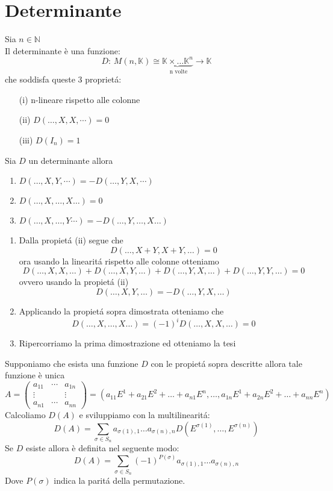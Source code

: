 %

\section{Determinante}

\begin{defn}[Determinante]
Sia $n \in \mathbb{N}$\\
Il determinante \`e una funzione:
$$ D: \,M(n, \mathbb{K})\cong \underbrace{ \mathbb{K } \times \dots \mathbb{K}^n}_\text{ n volte}
\to \mathbb{K}$$
che soddisfa queste 3 propriet\'a:
\begin{enumerate}
    \item[(i)] n-lineare rispetto alle colonne
    \item[(ii)] $ D ( \dots,X , X , \cdots )=0$ 
    \item[(iii)] $D(I_n)=1$
\end{enumerate}
\end{defn}
\begin{prop}
Sia $D$ un determinante allora 
\begin{enumerate}
\item $ D (\dots, X,Y, \cdots )=- D (\dots, Y,X, \cdots )$
\item $D (\dots, X , \dots, X \dots )=0 $
\item $D (\dots, X , \dots, Y \cdots )= - D (\dots, Y , \dots, X \dots )$
\end{enumerate}

\proof   \bbianco
\begin{enumerate}
\item  Dalla propiet\'a (ii) segue che 
$$ D ( \dots, X+Y, X+Y, \dots )=0 $$
ora usando la linearit\'a rispetto alle colonne otteniamo 
$$ D(\dots,X,X, \dots )+ D(\dots,X,Y, \dots ) + D(\dots,Y,X, \dots )+ D(\dots,Y,Y, \dots )=0 $$
ovvero usando la propiet\'a (ii)
$$ D (\dots , X,Y,\dots ) = - D ( \dots, Y,X, \dots ) $$
\item Applicando la propiet\'a sopra dimostrata otteniamo che 
$$D (\dots, X , \dots, X \dots )= (-1)^i D ( \dots,X,X,\dots)=0$$
\item Ripercorriamo la prima dimostrazione ed otteniamo la tesi
\end{enumerate}
\endproof
\end{prop}
\newpage
\begin{prop}[Unicit\'a di $D$]\bianco 
Supponiamo che esista una funzione $D$ con le propiet\'a sopra descritte allora tale funzione \`e unica
\proof
$$A= \begin{pmatrix}
a_{11} & \cdots & a_{1n}
\\
\vdots && \vdots\\
a_{n1}& \cdots & a_{nn}
\end{pmatrix}= (a_{11}E^1+ a_{21}E^2+ \dots + a_{n1}E^n, \dots ,
a_{1n}E^1+ a_{2n}E^2+ \dots + a_{nn}E^n) $$
Calcoliamo $D(A)$ e sviluppiamo con la multilinearit\'a:
$$ D(A)=\sum_{\sigma \in S_n} a_{\sigma(1),1}\dots a_{\sigma(n),n} D \left( E^{\sigma(1)} , \dots , E ^{\sigma(n)} \right)$$
Se $D$ esiste allora \`e definita nel seguente modo:
$$ D(A)= \sum_{\sigma \in S_n} (-1)^{P(\sigma)} a_{\sigma(1),1}\dots a_{\sigma(n),n}
$$ 
Dove $P(\sigma)$ indica la parit\'a della permutazione.
\end{prop}
